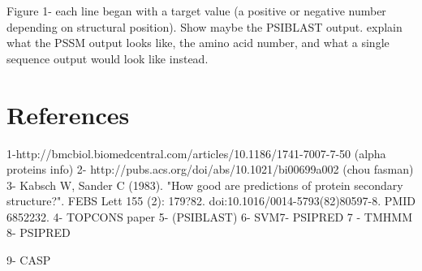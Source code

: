 \documentclass{article}
\begin{document}
Figure 1- each line began with a target value (a positive or negative number depending on structural position). Show maybe the PSIBLAST output. explain what the PSSM output looks like, the amino acid number, and what a single sequence output would look like instead.










\section{References}
1-http://bmcbiol.biomedcentral.com/articles/10.1186/1741-7007-7-50    (alpha proteins info)
2- http://pubs.acs.org/doi/abs/10.1021/bi00699a002    (chou fasman)
3- Kabsch W, Sander C (1983). "How good are predictions of protein secondary structure?". FEBS Lett 155 (2): 179?82. doi:10.1016/0014-5793(82)80597-8. PMID 6852232.  
4- TOPCONS paper
5-  (PSIBLAST) 
6- SVM7- PSIPRED
7 - TMHMM
8- PSIPRED

9- CASP
\end{document}
